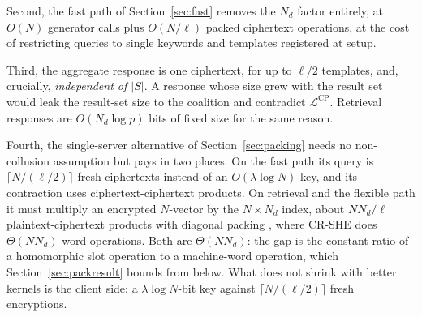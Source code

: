 \documentclass[a4paper,fleqn]{cas-sc}
\newcommand{\Leak}{\mathcal{L}}
\begin{document}
Second, the fast path of Section~\ref{sec:fast} removes the $N_d$ factor
entirely, at $O(N)$ generator calls plus $O(N/\ell)$ packed ciphertext
operations, at the cost of restricting queries to single keywords and
templates registered at setup.

Third, the aggregate response is one ciphertext, for up to $\ell/2$ templates,
and, crucially, \emph{independent of $|S|$}. A response whose size grew with the result set
would leak the result-set size to the coalition and contradict
$\Leak^{\text{CP}}$. Retrieval responses are $O(N_d\log p)$ bits of fixed size
for the same reason.

Fourth, the single-server alternative of Section~\ref{sec:packing} needs no
non-collusion assumption but pays in two places. On the fast path its query is
$\lceil N/(\ell/2)\rceil$ fresh ciphertexts instead of an $O(\lambda\log N)$
key, and its contraction uses ciphertext-ciphertext products. On retrieval and
the flexible path it must multiply an encrypted $N$-vector by the
$N\times N_d$ index, about $NN_d/\ell$ plaintext-ciphertext products with
diagonal packing \citep{halevi2014algorithms}, where CR-SHE does $\Theta(NN_d)$
word operations. Both are $\Theta(NN_d)$: the gap is the constant ratio of a
homomorphic slot operation to a machine-word operation, which
Section~\ref{sec:packresult} bounds from below. What does not shrink with
better kernels is the client side: a $\lambda\log N$-bit key against
$\lceil N/(\ell/2)\rceil$ fresh encryptions.
\end{document}
